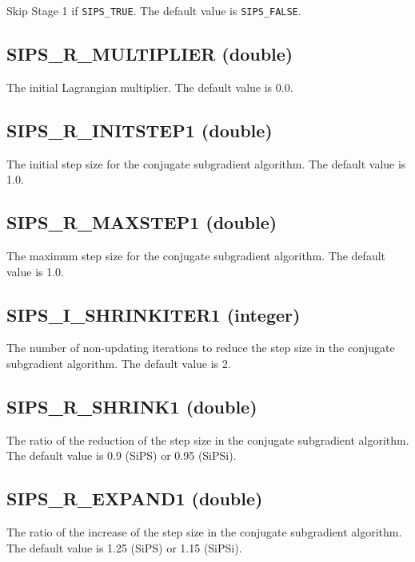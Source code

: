 \documentclass[a4paper]{book}
\begin{document}
Skip Stage 1 if \verb+SIPS_TRUE+.
The default value is \verb+SIPS_FALSE+.

\hypertarget{MULTIPLIER}{%
\subsection{SIPS\_R\_MULTIPLIER (double)}
}

The initial Lagrangian multiplier.
The default value is 0.0.

\hypertarget{INITSTEP1}{%
\subsection{SIPS\_R\_INITSTEP1 (double)}
}

The initial step size for the conjugate subgradient algorithm.
The default value is 1.0.

\hypertarget{MAXSTEP1}{%
\subsection{SIPS\_R\_MAXSTEP1 (double)}
}

The maximum step size for the conjugate subgradient algorithm.
The default value is 1.0.

\hypertarget{SHRINKITER1}{%
\subsection{SIPS\_I\_SHRINKITER1 (integer)}
}

The number of non-updating iterations 
to reduce the step size in the conjugate subgradient algorithm.
The default value is 2.

\hypertarget{SHRINK1}{%
\subsection{SIPS\_R\_SHRINK1 (double)}
}

The ratio of the reduction of the step size
in the conjugate subgradient algorithm.
The default value is 0.9 (SiPS) or 0.95 (SiPSi).

\hypertarget{EXPAND1}{%
\subsection{SIPS\_R\_EXPAND1 (double)}
}

The ratio of the increase of the step size
in the conjugate subgradient algorithm.
The default value is 1.25 (SiPS) or 1.15 (SiPSi).
\end{document}
